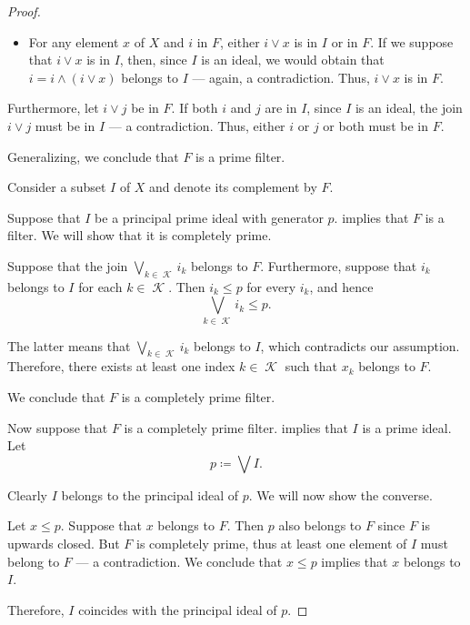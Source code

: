 \begin{proof}
\begin{itemize}
    \item For any element \( x \) of \( X \) and \( i \) in \( F \), either \( i \vee x \) is in \( I \) or in \( F \). If we suppose that \( i \vee x \) is in \( I \), then, since \( I \) is an ideal, we would obtain that \( i = i \wedge (i \vee x) \) belongs to \( I \) --- again, a contradiction. Thus, \( i \vee x \) is in \( F \).
  \end{itemize}

  Furthermore, let \( i \vee j \) be in \( F \). If both \( i \) and \( j \) are in \( I \), since \( I \) is an ideal, the join \( i \vee j \) must be in \( I \) --- a contradiction. Thus, either \( i \) or \( j \) or both must be in \( F \).

  Generalizing, we conclude that \( F \) is a prime filter.

   Consider a subset \( I \) of \( X \) and denote its complement by \( F \).

  \SufficiencySubProof* Suppose that \( I \) be a principal prime ideal with generator \( p \).  implies that \( F \) is a filter. We will show that it is completely prime.

  Suppose that the join \( \bigvee_{k \in \mscrK} i_k \) belongs to \( F \). Furthermore, suppose that \( i_k \) belongs to \( I \) for each \( k \in \mscrK \). Then \( i_k \leq p \) for every \( i_k \), and hence
  \begin{equation*}
    \bigvee_{k \in \mscrK} i_k \leq p.
  \end{equation*}

  The latter means that \( \bigvee_{k \in \mscrK} i_k \) belongs to \( I \), which contradicts our assumption. Therefore, there exists at least one index \( k \in \mscrK \) such that \( x_k \) belongs to \( F \).

  We conclude that \( F \) is a completely prime filter.

  \NecessitySubProof* Now suppose that \( F \) is a completely prime filter.  implies that \( I \) is a prime ideal. Let
  \begin{equation*}
    p \coloneqq \bigvee I.
  \end{equation*}

  Clearly \( I \) belongs to the principal ideal of \( p \). We will now show the converse.

  Let \( x \leq p \). Suppose that \( x \) belongs to \( F \). Then \( p \) also belongs to \( F \) since \( F \) is upwards closed. But \( F \) is completely prime, thus at least one element of \( I \) must belong to \( F \) --- a contradiction. We conclude that \( x \leq p \) implies that \( x \) belongs to \( I \).

  Therefore, \( I \) coincides with the principal ideal of \( p \).
\end{proof}

